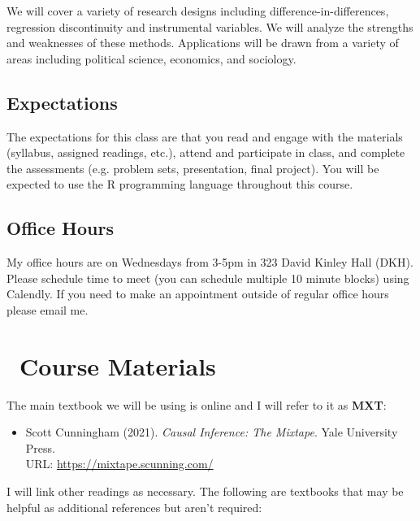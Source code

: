 \documentclass[11pt,letterpaper]{article}
\begin{document}
We will cover a variety of research designs including difference-in-differences, regression discontinuity and instrumental variables. We will analyze the strengths and weaknesses of these methods. Applications will be drawn from a variety of areas including political science, economics, and sociology.

\subsection*{Expectations}

The expectations for this class are that you read and engage with the materials (syllabus, assigned readings, etc.), attend and participate in class, and complete the assessments (e.g. problem sets, presentation, final project). You will be expected to use the R programming language throughout this course.

\subsection*{Office Hours}

My office hours are on Wednesdays from 3-5pm in 323 David Kinley Hall (DKH). Please schedule time to meet (you can schedule multiple 10 minute blocks) using Calendly. If you need to make an appointment outside of regular office hours please email me.

\section*{\faBookOpen\ Course Materials}

The main textbook we will be using is online and I will refer to it as \textbf{MXT}:

\begin{itemize}[leftmargin=*]
  \item Scott Cunningham (2021). \textit{Causal Inference: The Mixtape}. Yale University Press. \\ URL: \href{https://mixtape.scunning.com/}{https://mixtape.scunning.com/}
\end{itemize}

I will link other readings as necessary. The following are textbooks that may be helpful as additional references but aren't required:
\end{document}
